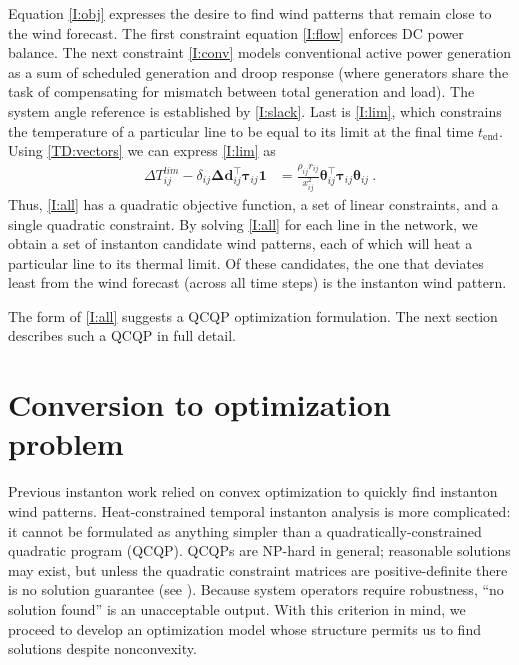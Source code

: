 \documentclass[conference]{IEEEtran}
\begin{document}
Equation \eqref{I:obj} expresses the desire to find wind patterns that remain close to the wind forecast. The first constraint equation \eqref{I:flow} enforces DC power balance. The next constraint \eqref{I:conv} models conventional active power generation as a sum of
scheduled generation and droop response (where generators share the task of compensating for mismatch between total generation and load). The system angle reference is established by \eqref{I:slack}. Last is \eqref{I:lim}, which constrains the temperature of a particular line to be equal to its limit at the final time $t_\text{end}$. Using \eqref{TD:vectors} we can express \eqref{I:lim} as
\begin{align}\label{temp}
\Delta T_{ij}^{lim} - \delta_{ij} \boldsymbol{\Delta d}_{ij}^\top \boldsymbol{\tau}_{ij}\mathbf{1}   &= \frac{\rho_{ij}r_{ij}}{x_{ij}^2} \boldsymbol{\theta}_{ij}^\top \boldsymbol{\tau}_{ij} \boldsymbol{\theta}_{ij}~.
\end{align}
Thus, \eqref{I:all} has a quadratic objective function, a set of linear constraints, and a single quadratic constraint. By solving \eqref{I:all} for each line in the network, we obtain a set of instanton candidate wind patterns, each of which will heat a particular line to its thermal limit. Of these candidates, the one that deviates least from the wind forecast (across all time steps) is the instanton wind pattern.

The form of \eqref{I:all} suggests a QCQP optimization formulation. The next section describes such a QCQP in full detail.

\section{Conversion to optimization problem}\label{sec:optimization}
Previous instanton work relied on convex optimization to quickly find instanton wind patterns. Heat-constrained temporal instanton analysis is more complicated:  it cannot be formulated as anything simpler than a quadratically-constrained quadratic program (QCQP). QCQPs are NP-hard in general; reasonable solutions may exist, but unless the quadratic constraint matrices are positive-definite there is no solution guarantee (see \cite{mehanna2014}). Because system operators require robustness, ``no solution found'' is an unacceptable output. With this criterion in mind, we proceed to develop an optimization model whose structure permits us to find solutions despite nonconvexity.
\end{document}
